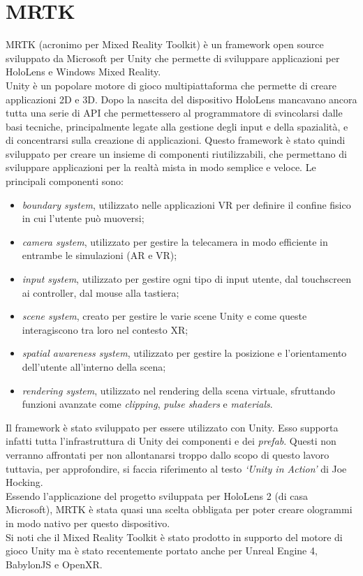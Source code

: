 \section{MRTK}\label{sec:MRTK}
MRTK (acronimo per Mixed Reality Toolkit) è un framework open source sviluppato da Microsoft per Unity che permette di sviluppare applicazioni per HoloLens e Windows Mixed Reality\cite{MRTK}.\\
Unity è un popolare motore di gioco multipiattaforma che permette di creare applicazioni 2D e 3D.
Dopo la nascita del dispositivo HoloLens mancavano ancora tutta una serie di API che permettessero al programmatore di svincolarsi dalle basi tecniche, principalmente legate 
alla gestione degli input e della spazialità, e di concentrarsi sulla creazione di applicazioni.
Questo framework è stato quindi sviluppato per creare un insieme di componenti riutilizzabili, che permettano di sviluppare applicazioni per la realtà mista in modo semplice e 
veloce. Le principali componenti sono:
\begin{itemize}
    \item \textit{boundary system}, utilizzato nelle applicazioni VR per definire il confine fisico in cui l'utente può muoversi;
    \item \textit{camera system}, utilizzato per gestire la telecamera in modo efficiente in entrambe le simulazioni (AR e VR);
    \item \textit{input system}, utilizzato per gestire ogni tipo di input utente, dal touchscreen ai controller, dal mouse alla tastiera;
    \item \textit{scene system}, creato per gestire le varie scene Unity e come queste interagiscono tra loro nel contesto XR;
    \item \textit{spatial awareness system}, utilizzato per gestire la posizione e l'orientamento dell'utente all'interno della scena;
    \item \textit{rendering system}, utilizzato nel rendering della scena virtuale, sfruttando funzioni avanzate come \textit{clipping}, \textit{pulse shaders} e \textit{materials}.
\end{itemize}
Il framework è stato sviluppato per essere utilizzato con Unity. Esso supporta infatti tutta l'infrastruttura di Unity dei componenti e dei \textit{prefab}. Questi
non verranno affrontati per non allontanarsi troppo dallo scopo di questo lavoro tuttavia, per approfondire, si faccia riferimento al testo \textit{`Unity in Action'} di Joe 
Hocking\cite{hocking2018}. \\
Essendo l'applicazione del progetto sviluppata per HoloLens 2 (di casa Microsoft), MRTK è stata quasi una scelta obbligata per poter creare ologrammi in modo nativo per questo dispositivo.\\
Si noti che il Mixed Reality Toolkit è stato prodotto in supporto del motore di gioco Unity ma è stato recentemente portato anche per Unreal Engine 4, BabylonJS e OpenXR.

